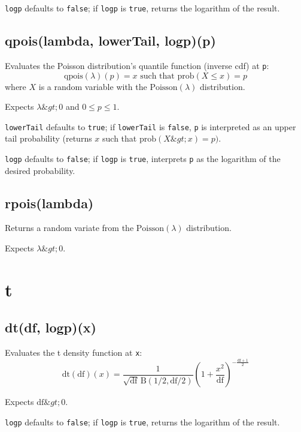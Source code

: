 \documentclass{article}
\begin{document}
\texttt{logp} defaults to \texttt{false}; if \texttt{logp} is \texttt{true}, returns the logarithm
of the result.


    \subsection*{qpois(lambda, lowerTail, logp)(p)}
    Evaluates the Poisson distribution's quantile function
(inverse cdf) at \texttt{p}:
$$\textrm{qpois}(\lambda)(p) = x \textrm{ such that } \textrm{prob}(X \leq x) = p$$
where $X$ is a random variable with the $\textrm{Poisson}(\lambda)$ distribution.


Expects $\lambda \&gt; 0$ and $0 \leq p \leq 1$.


\texttt{lowerTail} defaults to \texttt{true}; if \texttt{lowerTail} is \texttt{false}, \texttt{p} is
interpreted as an upper tail probability (returns
$x$ such that $\textrm{prob}(X \&gt; x) = p)$.


\texttt{logp} defaults to \texttt{false}; if \texttt{logp} is \texttt{true}, interprets \texttt{p} as
the logarithm of the desired probability.


    \subsection*{rpois(lambda)}
    Returns a random variate from the $\textrm{Poisson}(\lambda)$ distribution.


Expects $\lambda \&gt; 0$.


  \section{t}
    \subsection*{dt(df, logp)(x)}
    Evaluates the t density function at \texttt{x}:
$$\textrm{dt}(\textrm{df})(x) = \frac{1}{\sqrt{\textrm{df}}\,\textrm{B}(1/2, \textrm{df}/2)} \left(1+\frac{x^2}{\textrm{df}} \right)^{-\frac{\textrm{df} + 1}{2}}$$


Expects $\textrm{df} \&gt; 0$.


\texttt{logp} defaults to \texttt{false}; if \texttt{logp} is \texttt{true}, returns the
logarithm of the result.
\end{document}
